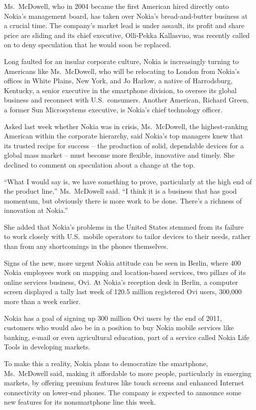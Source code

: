 ﻿\documentclass[12pt]{article}
\begin{document}
Ms.~McDowell, who in 2004 became the first American hired directly onto Nokia's management board,
has taken over Nokia's bread-and-butter business at a crucial time. The company's market lead is
under assault, its profit and share price are sliding and its chief executive, Olli-Pekka Kallasvuo,
was recently called on to deny speculation that he would soon be replaced.

Long faulted for an insular corporate culture, Nokia is increasingly turning to Americans like
Ms.~McDowell, who will be relocating to London from Nokia's offices in White Plains, New York, and
Jo Harlow, a native of Harrodsburg, Kentucky, a senior executive in the smartphone division, to
oversee its global business and reconnect with U.S.~consumers. Another American, Richard Green, a
former Sun Microsystems executive, is Nokia's chief technology officer.

Asked last week whether Nokia was in crisis, Ms.~McDowell, the highest-ranking American within the
corporate hierarchy, said Nokia's top managers knew that its trusted recipe for success -- the
production of solid, dependable devices for a global mass market -- must become more flexible,
innovative and timely. She declined to comment on speculation about a change at the top.

``What I would say is, we have something to prove, particularly at the high end of the product
line,'' Ms.~McDowell said. ``I think it is a business that has good momentum, but obviously there is
more work to be done. There's a richness of innovation at Nokia.''

She added that Nokia's problems in the United States stemmed from its failure to work closely with
U.S.~mobile operators to tailor devices to their needs, rather than from any shortcomings in the
phones themselves.

Signs of the new, more urgent Nokia attitude can be seen in Berlin, where 400 Nokia employees work
on mapping and location-based services, two pillars of its online services business, Ovi. At Nokia's
reception desk in Berlin, a computer screen displayed a tally last week of 120.5 million registered
Ovi users, 300,000 more than a week earlier.

Nokia has a goal of signing up 300 million Ovi users by the end of 2011, customers who would also be
in a position to buy Nokia mobile services like banking, e-mail or even agricultural education, part
of a service called Nokia Life Tools in developing markets.

To make this a reality, Nokia plans to democratize the smartphone, Ms.~McDowell said, making it
affordable to more people, particularly in emerging markets, by offering premium features like touch
screens and enhanced Internet connectivity on lower-end phones. The company is expected to announce
some new features for its nonsmartphone line this week.
\end{document}
